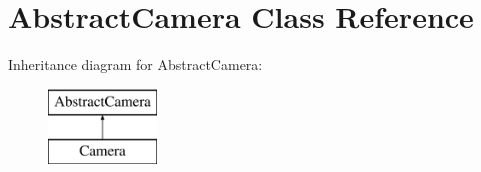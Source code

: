 \hypertarget{classAbstractCamera}{}\section{Abstract\+Camera Class Reference}
\label{classAbstractCamera}
Inheritance diagram for Abstract\+Camera\+:\begin{figure}[H]
\begin{center}
\leavevmode
\includegraphics[height=2.000000cm]{classAbstractCamera}
\end{center}
\end{figure}
